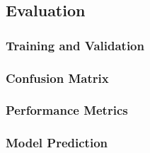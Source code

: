 
\subsection{Evaluation}

\subsubsection{Training and Validation}

\subsubsection{Confusion Matrix}

\subsubsection{Performance Metrics}

\subsubsection{Model Prediction}

